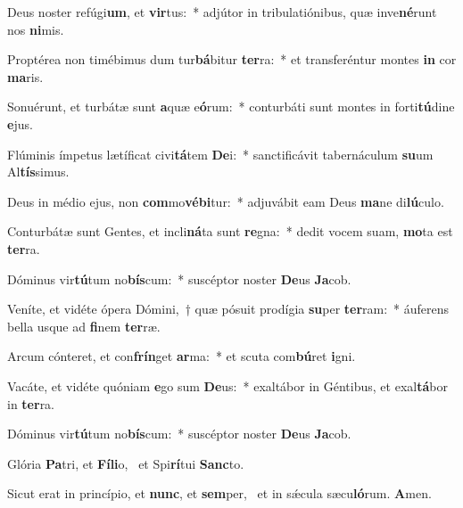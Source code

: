 \item Deus noster refúgi\textbf{um}, et \textbf{vir}tus:~* adjútor in tribulatiónibus, quæ inve\textbf{né}runt nos \textbf{ni}mis.
\item Proptérea non timébimus dum tur\textbf{bá}bitur \textbf{ter}ra:~* et transferéntur montes \textbf{in} cor \textbf{ma}ris.
\item Sonuérunt, et turbátæ sunt \textbf{a}quæ e\textbf{ó}rum:~* conturbáti sunt montes in forti\textbf{tú}dine \textbf{e}jus.
\item Flúminis ímpetus lætíficat civi\textbf{tá}tem \textbf{De}i:~* sanctificávit tabernáculum \textbf{su}um Al\textbf{tís}simus.
\item Deus in médio ejus, non \textbf{com}mo\textbf{vé}\textbf{bi}tur:~* adjuvábit eam Deus \textbf{ma}ne di\textbf{lú}culo.
\item Conturbátæ sunt Gentes, et incli\textbf{ná}ta sunt \textbf{re}gna:~* dedit vocem suam, \textbf{mo}ta est \textbf{ter}ra.
\item Dóminus vir\textbf{tú}tum no\textbf{bís}\-cum:~* suscéptor noster \textbf{De}us \textbf{Ja}cob.
\item Veníte, et vidéte ópera Dómini,~† quæ pósuit prodígia \textbf{su}per \textbf{ter}ram:~* áuferens bella usque ad \textbf{fi}nem \textbf{ter}ræ.
\item Arcum cónteret, et con\textbf{frín}get \textbf{ar}ma:~* et scuta com\textbf{bú}ret \textbf{i}gni.
\item Vacáte, et vidéte quóniam \textbf{e}go sum \textbf{De}us:~* exaltábor in Géntibus, et exal\textbf{tá}bor in \textbf{ter}ra.
\item Dóminus vir\textbf{tú}tum no\textbf{bís}\-cum:~* suscéptor noster \textbf{De}us \textbf{Ja}cob.
\item Glória \textbf{Pa}tri, et \textbf{Fí}\textbf{li}o,~\psstar{} et Spi\textbf{rí}tui \textbf{Sanc}to.
\item Sicut erat in princípio, et \textbf{nunc}, et \textbf{sem}per,~\psstar{} et in sǽcula sæcu\textbf{ló}rum. \textbf{A}men.